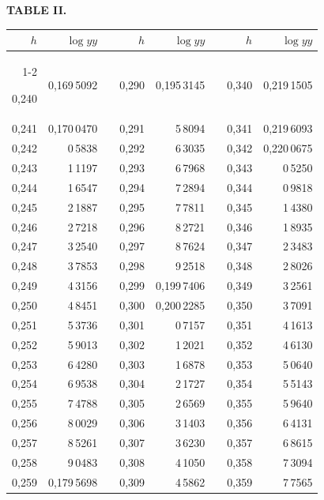 \endgroup
\clearpage
{}
\begingroup
\centering
\fontsize{9}{9}\selectfont
\setlength{\tabcolsep}{8pt}
\renewcommand{\arraystretch}{1}
\setlength{\parskip}{0pt}
\textbf{TABLE II.}
\par\vspace{7pt}
\begin{tabular}{|r|r|@{}p{9pt}@{}|r|r|@{}p{9pt}@{}|r|r|}
\hline
\rule{0pt}{8.5pt}\(h\) & \(\log yy\) & & \(h\) & \(\log yy\) & & \(h\) & \(\log yy\) \\
\cline{1-2}\cline{4-5}\cline{7-8}
\rule{0pt}{8.5pt}0,240 & 0,169\,5092 &  & 0,290 & 0,195\,3145 &  & 0,340 & 0,219\,1505 \\
0,241 & 0,170\,0470 &  & 0,291 & 5\,8094 &  & 0,341 & 0,219\,6093 \\
0,242 & 0\,5838 &  & 0,292 & 6\,3035 &  & 0,342 & 0,220\,0675 \\
0,243 & 1\,1197 &  & 0,293 & 6\,7968 &  & 0,343 & 0\,5250 \\
0,244 & 1\,6547 &  & 0,294 & 7\,2894 &  & 0,344 & 0\,9818 \\
0,245 & 2\,1887 &  & 0,295 & 7\,7811 &  & 0,345 & 1\,4380 \\[3pt]
0,246 & 2\,7218 &  & 0,296 & 8\,2721 &  & 0,346 & 1\,8935 \\
0,247 & 3\,2540 &  & 0,297 & 8\,7624 &  & 0,347 & 2\,3483 \\
0,248 & 3\,7853 &  & 0,298 & 9\,2518 &  & 0,348 & 2\,8026 \\
0,249 & 4\,3156 &  & 0,299 & 0,199\,7406 &  & 0,349 & 3\,2561 \\
0,250 & 4\,8451 &  & 0,300 & 0,200\,2285 &  & 0,350 & 3\,7091 \\[3pt]
0,251 & 5\,3736 &  & 0,301 & 0\,7157 &  & 0,351 & 4\,1613 \\
0,252 & 5\,9013 &  & 0,302 & 1\,2021 &  & 0,352 & 4\,6130 \\
0,253 & 6\,4280 &  & 0,303 & 1\,6878 &  & 0,353 & 5\,0640 \\
0,254 & 6\,9538 &  & 0,304 & 2\,1727 &  & 0,354 & 5\,5143 \\
0,255 & 7\,4788 &  & 0,305 & 2\,6569 &  & 0,355 & 5\,9640 \\[3pt]
0,256 & 8\,0029 &  & 0,306 & 3\,1403 &  & 0,356 & 6\,4131 \\
0,257 & 8\,5261 &  & 0,307 & 3\,6230 &  & 0,357 & 6\,8615 \\
0,258 & 9\,0483 &  & 0,308 & 4\,1050 &  & 0,358 & 7\,3094 \\
0,259 & 0,179\,5698 &  & 0,309 & 4\,5862 &  & 0,359 & 7\,7565 \\

\end{tabular}
